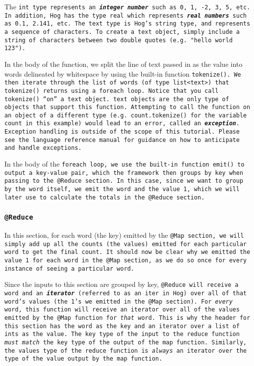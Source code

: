 \documentclass{article} \usepackage{fancyhdr, multicol}
\begin{document}
The \tt int \rm type represents an \textbf{\emph{integer number}} such as 0, 1, -2,
3, 5, etc. In addition, Hog has the type \tt real \rm which represents
\textbf{\emph{real numbers}} such as 0.1, 2.141, etc. The \tt text \rm type is
Hog's string type, and represents a sequence of characters. To create a \tt text
\rm object, simply include a string of characters between two double quotes (e.g.
\tt "hello world 123"\rm).

In the body of the function, we split the line of text passed in as the value into
words delineated by whitespace by using the built-in function \tt tokenize()\rm. We
then iterate through the \tt list \rm of words (of type \tt list<text>\rm) that \tt
tokenize() \rm returns using a \tt foreach \rm loop. Notice that you call \tt
tokenize() \rm ``on'' a \tt text \rm object. \tt text \rm objects are the only type
of objects that support this function. Attempting to call the function on an object
of a different type (e.g. \tt count.tokenize() \rm for the variable \tt count \rm
in this example) would lead to an error, called an \textbf{\emph{exception}}.
Exception handling is outside of the scope of this tutorial. Please see the
language reference manual for guidance on how to anticipate and handle exceptions.

In the body of the \tt foreach \rm loop, we use the built-in function \tt emit()
\rm to output a key-value pair, which the framework then groups by key when passing
to the \tt @Reduce \rm section. In this case, since we want to group by the word
itself, we emit the word and the value \tt 1\rm, which we will later use to
calculate the totals in the \tt @Reduce \rm section.

\subsubsection*{\tt @Reduce \rm}


In this section, for each word (the key) emitted by the \tt @Map \rm section, we
will simply add up all the counts (the values) emitted for each particular word to
get the final count. It should now be clear why we emitted the value \tt 1 \rm for
each word in the \tt @Map \rm section, as we do so once for every instance of
seeing a particular word.

Since the inputs to this section are grouped by key, \tt @Reduce \rm will receive a
word and an \textbf{\emph{iterator}} (referred to as an \tt iter \rm in Hog) over
all of that word's values (the \tt 1\rm's we emitted in the \tt @Map \rm section).
For \emph{every} word, this function will receive an iterator over all of the
values emitted by the \tt @Map \rm function for \emph{that} word. This is why the
header for this section has the word as the key and an iterator over a \tt list \rm
of \tt int\rm s as the value. The key type of the input to the reduce function
\emph{must match} the key type of the output of the map function. Similarly, the
values type of the reduce function is \emph{always} an iterator over the type of
the value output by the map function.
\end{document}

